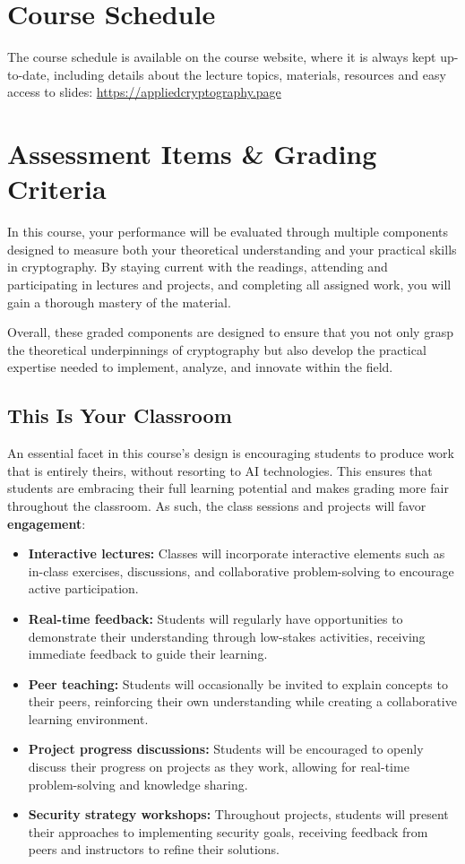 \documentclass[10pt,a4paper,american]{exam}
\begin{document}
\section{Course Schedule}
The course schedule is available on the course website, where it is always kept up-to-date, including details about the lecture topics, materials, resources and easy access to slides: \url{https://appliedcryptography.page}

\section{Assessment Items \& Grading Criteria}
In this course, your performance will be evaluated through multiple components designed to measure both your theoretical understanding and your practical skills in cryptography. By staying current with the readings, attending and participating in lectures and projects, and completing all assigned work, you will gain a thorough mastery of the material.

Overall, these graded components are designed to ensure that you not only grasp the theoretical underpinnings of cryptography but also develop the practical expertise needed to implement, analyze, and innovate within the field.

\subsection{This Is Your Classroom}
An essential facet in this course's design is encouraging students to produce work that is entirely theirs, without resorting to AI technologies. This ensures that students are embracing their full learning potential and makes grading more fair throughout the classroom. As such, the class sessions and projects will favor \textbf{engagement}:

\begin{itemize}
	\item \textbf{Interactive lectures:} Classes will incorporate interactive elements such as in-class exercises, discussions, and collaborative problem-solving to encourage active participation.
	\item \textbf{Real-time feedback:} Students will regularly have opportunities to demonstrate their understanding through low-stakes activities, receiving immediate feedback to guide their learning.
	\item \textbf{Peer teaching:} Students will occasionally be invited to explain concepts to their peers, reinforcing their own understanding while creating a collaborative learning environment.
	\item \textbf{Project progress discussions:} Students will be encouraged to openly discuss their progress on projects as they work, allowing for real-time problem-solving and knowledge sharing.
	\item \textbf{Security strategy workshops:} Throughout projects, students will present their approaches to implementing security goals, receiving feedback from peers and instructors to refine their solutions.
\end{itemize}
\end{document}
